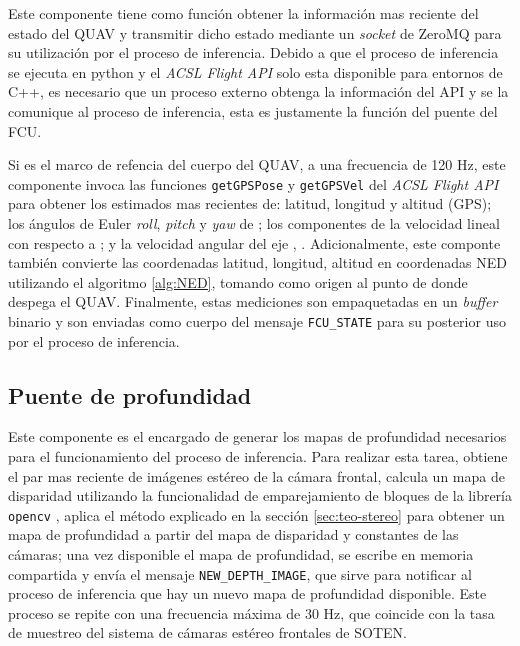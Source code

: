 Este componente tiene como función obtener la información mas reciente del estado del QUAV y transmitir dicho estado mediante un \textit{socket} de ZeroMQ para su utilización por el proceso de inferencia. Debido a que el proceso de inferencia se ejecuta en python y el \textit{ACSL Flight API} solo esta disponible para entornos de C++, es necesario que un proceso externo obtenga la información del API y se la comunique al proceso de inferencia, esta es justamente la función del puente del FCU.

Si  es el marco de refencia del cuerpo del QUAV, a una frecuencia de 120 Hz, este componente invoca las funciones \texttt{getGPSPose} y \texttt{getGPSVel} del \textit{ACSL Flight API} para obtener los estimados mas recientes de: latitud, longitud y altitud (GPS); los ángulos de Euler \textit{roll}, \textit{pitch} y \textit{yaw} de ; los componentes  de la velocidad lineal con respecto a ; y la velocidad angular del eje , . Adicionalmente, este componte también convierte las coordenadas latitud, longitud, altitud en coordenadas NED utilizando el algoritmo \ref{alg:NED}, tomando como origen al punto de donde despega el QUAV. Finalmente, estas mediciones son empaquetadas en un \textit{buffer} binario y son enviadas como cuerpo del mensaje \texttt{FCU\_STATE} para su posterior uso por el proceso de inferencia.


\subsection{Puente de profundidad}

Este componente es el encargado de generar los mapas de profundidad necesarios para el funcionamiento del proceso de inferencia. Para realizar esta tarea, obtiene el par mas reciente de imágenes estéreo de la cámara frontal, calcula un mapa de disparidad utilizando la funcionalidad de emparejamiento de bloques de la librería \texttt{opencv} \cite{bradski2000opencv}, aplica el método explicado en la sección \ref{sec:teo-stereo} para obtener un mapa de profundidad a partir del mapa de disparidad y constantes de las cámaras; una vez disponible el mapa de profundidad, se escribe en memoria compartida y envía el mensaje \texttt{NEW\_DEPTH\_IMAGE}, que sirve para notificar al proceso de inferencia que hay un nuevo mapa de profundidad disponible. Este proceso se repite con una frecuencia máxima de 30 Hz, que coincide con la tasa de muestreo del sistema de cámaras estéreo frontales de SOTEN.

